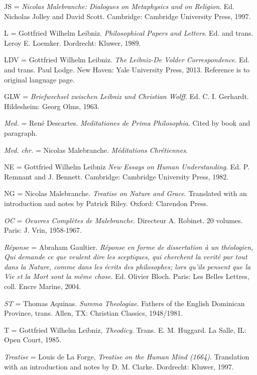 JS = \emph{Nicolas Malebranche: Dialogues on Metaphysics and on
	Religion}. Ed. Nicholas Jolley and David Scott. Cambridge: Cambridge
University Press, 1997.

L = Gottfried Wilhelm Leibniz. \emph{Philosophical Papers and Letters}.
Ed. and trans. Leroy E. Loemker. Dordrecht: Kluwer, 1989.

LDV = Gottfried Wilhelm Leibniz. \emph{The Leibniz-De Volder
	Correspondence}. Ed. and trans. Paul Lodge. New Haven: Yale University
Press, 2013. Reference is to original language page.

GLW = \emph{Briefwechsel zwischen Leibniz und Christian Wolff}. Ed. C.
I. Gerhardt. Hildesheim: Georg Olms, 1963.

\emph{Med.} = René Descartes. \emph{Meditationes de Prima Philosophia}.
Cited by book and paragraph.

\emph{Med.} \emph{chr.} = Nicolas Malebranche. \emph{Méditations
	Chrétiennes}.

NE = Gottfried Wilhelm Leibniz \emph{New Essays on Human Understanding}.
Ed. P. Remnant and J. Bennett. Cambridge: Cambridge University Press,
1982.

NG = Nicolas Malebranche. \emph{Treatise on Nature and Grace}.
Translated with an introduction and notes by Patrick Riley. Oxford:
Clarendon Press.

\emph{OC} = \emph{Oeuvres Complètes de Malebranche}. Directeur A.
Robinet. 20 volumes. Paris: J. Vrin, 1958-1967.

\emph{Réponse} = Abraham Gaultier. \emph{Réponse en forme de
	dissertation à un théologien, Qui demande ce que veulent dire les
	sceptiques, qui cherchent la verité par tout dans la Nature, comme dans
	les écrits des philosophes; lors qu'ils pensent que la Vie et la Mort
	sont la même chose}. Ed. Olivier Bloch. Paris: Les Belles Lettres, coll.
Encre Marine, 2004.

\emph{ST} = Thomas Aquinas. \emph{Summa Theologiae}. Fathers of the
English Dominican Province, trans. Allen, TX: Christian Classics,
1948/1981.

T = Gottfried Wilhelm Leibniz, \emph{Theodicy}. Trans. E. M. Huggard. La
Salle, IL: Open Court, 1985.

\emph{Treatise} = Louis de La Forge, \emph{Treatise on the Human Mind
	(1664)}. Translation with an introduction and notes by D. M. Clarke.
Dordrecht: Kluwer, 1997.



%
